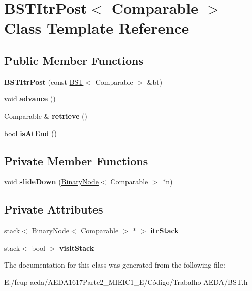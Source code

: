 \hypertarget{class_b_s_t_itr_post}{}\section{B\+S\+T\+Itr\+Post$<$ Comparable $>$ Class Template Reference}
\label{class_b_s_t_itr_post}
\subsection*{Public Member Functions}
\begin{DoxyCompactItemize}
\item 
\mbox{\label{class_b_s_t_itr_post_acf7e537dea01978f40c40909c55c56c2}} 
{\bfseries B\+S\+T\+Itr\+Post} (const \hyperlink{class_b_s_t}{B\+ST}$<$ Comparable $>$ \&bt)
\item 
\mbox{\label{class_b_s_t_itr_post_a376098e5a82cd02118dd4dcdec49bb26}} 
void {\bfseries advance} ()
\item 
\mbox{\label{class_b_s_t_itr_post_a72446e4d0df0bcafc14294a78faeb56e}} 
Comparable \& {\bfseries retrieve} ()
\item 
\mbox{\label{class_b_s_t_itr_post_a2f330e73bb817e8bd1c797805e66ddb7}} 
bool {\bfseries is\+At\+End} ()
\end{DoxyCompactItemize}
\subsection*{Private Member Functions}
\begin{DoxyCompactItemize}
\item 
\mbox{\label{class_b_s_t_itr_post_a56a13ae3a0358eeb06a83d4de745344a}} 
void {\bfseries slide\+Down} (\hyperlink{class_binary_node}{Binary\+Node}$<$ Comparable $>$ $\ast$n)
\end{DoxyCompactItemize}
\subsection*{Private Attributes}
\begin{DoxyCompactItemize}
\item 
\mbox{\label{class_b_s_t_itr_post_add32204909b8a6c3635b926832192ced}} 
stack$<$ \hyperlink{class_binary_node}{Binary\+Node}$<$ Comparable $>$ $\ast$ $>$ {\bfseries itr\+Stack}
\item 
\mbox{\label{class_b_s_t_itr_post_a5a9af907c7b135acdf3b5ed9affbb9a7}} 
stack$<$ bool $>$ {\bfseries visit\+Stack}
\end{DoxyCompactItemize}


The documentation for this class was generated from the following file\+:\begin{DoxyCompactItemize}
\item 
E\+:/feup-\/aeda/\+A\+E\+D\+A1617\+Parte2\+\_\+M\+I\+E\+I\+C1\+\_\+\+E/\+Código/\+Trabalho A\+E\+D\+A/B\+S\+T.\+h\end{DoxyCompactItemize}
